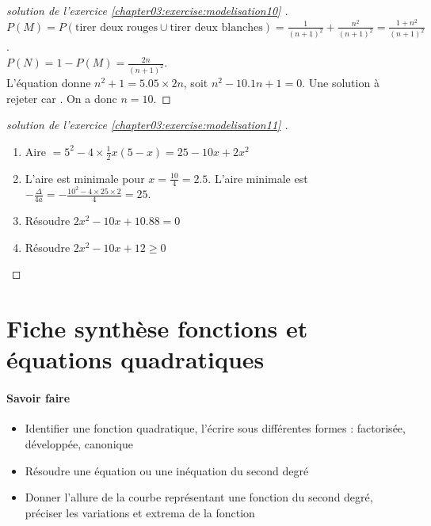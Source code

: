\documentclass[main.tex]{subfiles}
\begin{document}
\begin{proof}[solution de l'exercice \ref{chapter03:exercise:modelisation10} ]
$P(M)=P(\text{tirer deux rouges}\cup \text{tirer deux blanches})=\frac{1}{(n+1)^2}+\frac{n^2}{(n+1)^2}=\frac{1+n^2}{(n+1)^2}$. \\
 $P(N)=1-P(M)=\frac{2n}{(n+1)^2}$.\\
L'équation donne $n^2+1=5.05 \times 2n$, soit $n^2-10.1n+1=0$. Une solution à rejeter car \dotfill. On a donc $n=10$.
\end{proof}
\begin{proof}[solution de l'exercice \ref{chapter03:exercise:modelisation11} ]\hfill \\
		\begin{enumerate}[label=\alph*),leftmargin=*]
		\item Aire $=5^2-4\times \frac{1}{2}x(5-x)=25-10x+2x^2$
		\item L'aire est minimale pour $x=\tfrac{10}{4}=2.5$. L'aire minimale est $-\frac{\Delta}{4a}=-\frac{10^2-4\times 25\times 2}{4}=25$.
		\item Résoudre $2x^2-10x+10.88 = 0$  
		\item Résoudre $2x^2-10x+12\geqslant 0$
	\end{enumerate}
\end{proof}
%	 

\newpage  
\pagestyle{empty} %
\onehalfspacing
\section{Fiche synthèse fonctions et équations quadratiques}

\paragraph{Savoir faire}

\begin{itemize}
	\item [$\Box$] Identifier une fonction quadratique, l'écrire sous différentes formes : factorisée, développée, canonique
	\item [$\Box$] Résoudre une équation ou une inéquation du second degré 
	\item [$\Box$] Donner l'allure de la courbe représentant une fonction du second degré, préciser les variations et extrema de la fonction
\end{itemize}
\end{document}
